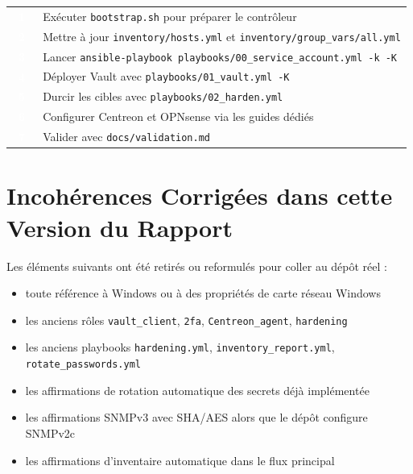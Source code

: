 \documentclass[11pt,a4paper]{article}
\begin{document}
\begin{tcolorbox}[
  enhanced,
  colback=white,
  colframe=BorderGray,
  boxrule=0.8pt,
  arc=8pt,
  left=10pt,right=10pt,top=10pt,bottom=10pt
]
\renewcommand{\arraystretch}{1.5}
\begin{tabular}{@{} C{1.2cm} L{13cm} @{}}
  \textcolor{white}{\colorbox{PrimaryBlue}{\textbf{\small\ 1\ }}} & Exécuter \texttt{bootstrap.sh} pour préparer le contrôleur \\
  \textcolor{white}{\colorbox{PrimaryBlue}{\textbf{\small\ 2\ }}} & Mettre à jour \texttt{inventory/hosts.yml} et \texttt{inventory/group\_vars/all.yml} \\
  \textcolor{white}{\colorbox{PrimaryBlue}{\textbf{\small\ 3\ }}} & Lancer \texttt{ansible-playbook playbooks/00\_service\_account.yml -k -K} \\
  \textcolor{white}{\colorbox{PrimaryBlue}{\textbf{\small\ 4\ }}} & Déployer Vault avec \texttt{playbooks/01\_vault.yml -K} \\
  \textcolor{white}{\colorbox{PrimaryBlue}{\textbf{\small\ 5\ }}} & Durcir les cibles avec \texttt{playbooks/02\_harden.yml} \\
  \textcolor{white}{\colorbox{PrimaryBlue}{\textbf{\small\ 6\ }}} & Configurer Centreon et OPNsense via les guides dédiés \\
  \textcolor{white}{\colorbox{PrimaryBlue}{\textbf{\small\ 7\ }}} & Valider avec \texttt{docs/validation.md} \\
\end{tabular}
\end{tcolorbox}

\section{Incohérences Corrigées dans cette Version du Rapport}

Les éléments suivants ont été retirés ou reformulés pour coller au dépôt réel :

\begin{itemize}
  \item toute référence à Windows ou à des propriétés de carte réseau Windows
  \item les anciens rôles \texttt{vault\_client}, \texttt{2fa}, \texttt{Centreon\_agent}, \texttt{hardening}
  \item les anciens playbooks \texttt{hardening.yml}, \texttt{inventory\_report.yml}, \texttt{rotate\_passwords.yml}
  \item les affirmations de rotation automatique des secrets déjà implémentée
  \item les affirmations SNMPv3 avec SHA/AES alors que le dépôt configure SNMPv2c
  \item les affirmations d'inventaire automatique dans le flux principal
\end{itemize}
\end{document}
